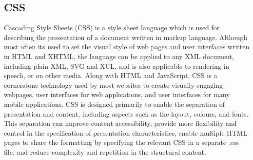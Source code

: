 \subsection{CSS}
Cascading Style Sheets (CSS) is a style sheet language which is used for describing the presentation
of a document written in markup language. Although most often its used to set the visual style of
web pages and user interfaces written in HTML and XHTML, the language can be applied to any
XML document, including plain XML, SVG and XUL, and is also applicable to rendering in speech,
or on other media. Along with HTML and JavaScript, CSS is a cornerstone technology used by
most websites to create visually engaging webpages, user interfaces for web applications, and user
interfaces for many mobile applications.
CSS is designed primarily to enable the separation of presentation and content, including aspects
such as the layout, colours, and fonts. This separation can improve content accessibility, provide more
flexibility and control in the specification of presentation characteristics, enable multiple HTML pages to share the formatting by specifying the relevant CSS in a separate .css file, and reduce complexity
and repetition in the structural content.
